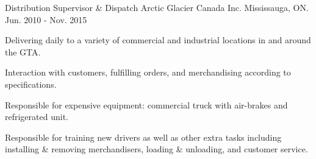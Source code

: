 \begin{cventries}
  \cventry
    {Distribution Supervisor \& Dispatch} %
    {Arctic Glacier Canada Inc.} %
    {Mississauga, ON.} %
    {Jun. 2010 - Nov. 2015} %
    {
    \begin{cvitems} %
      \item {Delivering daily to a variety of commercial and industrial locations in and around the GTA.}
      \item {Interaction with customers, fulfilling orders, and merchandising according to specifications.}
      \item {Responsible for expensive equipment: commercial truck with air-brakes and refrigerated unit.}
      \item {Responsible for training new drivers as well as other extra tasks including installing \& removing merchandisers, loading \& unloading, and customer service.}
    \end{cvitems}
    }

\end{cventries}
